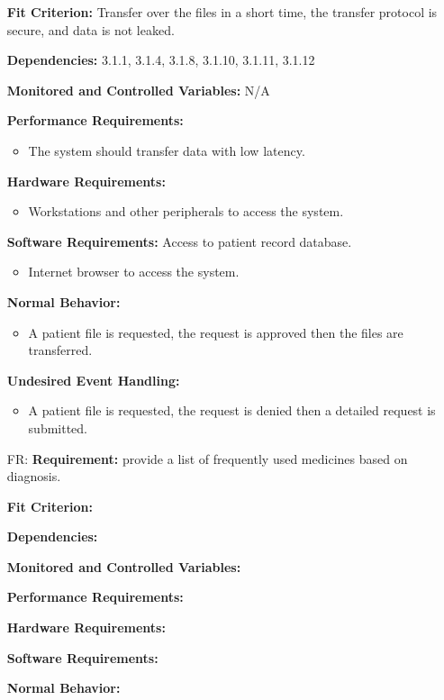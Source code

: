 \documentclass[12pt]{article}
\newcounter{reqnum} %
\begin{document}
\begin{itemize}
\textbf{Fit Criterion:} Transfer over the files in a short time, the transfer protocol is secure, and data is not leaked.

\textbf{Dependencies:} 3.1.1, 3.1.4, 3.1.8, 3.1.10, 3.1.11, 3.1.12

\textbf{Monitored and Controlled Variables:} N/A

\textbf{Performance Requirements:}
\begin{itemize}
  \item The system should transfer data with low latency.
\end{itemize}

\textbf{Hardware Requirements:} 
\begin{itemize}
  \item Workstations and other peripherals to access the system.
\end{itemize}

\textbf{Software Requirements:}
Access to patient record database.
\begin{itemize}
  \item Internet browser to access the system. 
\end{itemize}

\textbf{Normal Behavior:}
\begin{itemize}
  \item A patient file is requested, the request is approved then the files are transferred.
\end{itemize}

\textbf{Undesired Event Handling:}
\begin{itemize}
  \item A patient file is requested, the request is denied then a detailed request is submitted.
\end{itemize}

\item[FR\refstepcounter{reqnum}\thereqnum \label{FR_meaningfulLabel}:] 
\textbf{Requirement:} provide a list of frequently used medicines based on diagnosis.

\textbf{Fit Criterion:}  

\textbf{Dependencies:}  

\textbf{Monitored and Controlled Variables:} 

\textbf{Performance Requirements:} 

\textbf{Hardware Requirements:} 

\textbf{Software Requirements:} 

\textbf{Normal Behavior:} 


\end{itemize}
\end{document}
